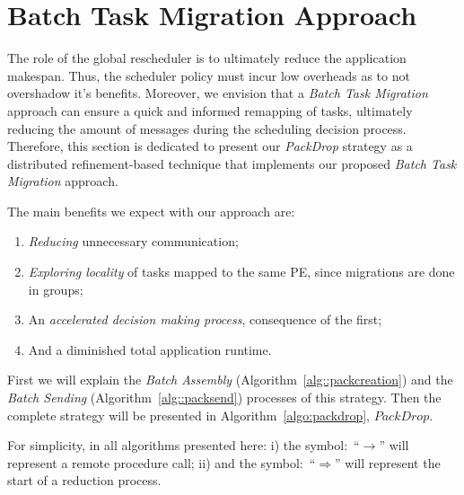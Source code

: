 \section{Batch Task Migration Approach} \label{sec:algo}


The role of the global rescheduler is to ultimately reduce the application makespan. 
Thus, the scheduler policy must incur low overheads as to not overshadow it's benefits. 
Moreover, we envision that a \textit{Batch Task Migration} approach can ensure a quick and informed remapping of tasks, ultimately reducing the amount of messages during the scheduling decision process. 
Therefore, this section is dedicated to present our \textit{PackDrop} strategy as a distributed refinement-based technique that implements our proposed \textit{Batch Task Migration} approach.

The main benefits we expect with our approach are: 
\begin{enumerate}
	\item \textit{Reducing} unnecessary communication;
	\item \textit{Exploring locality} of tasks mapped to the same PE, since migrations are done in groups;
	\item An \textit{accelerated decision making process}, consequence of the first;
	\item And a diminished total application runtime.
\end{enumerate}

First we will explain the \textit{Batch Assembly} (Algorithm~\ref{alg::packcreation}) and the \textit{Batch Sending} (Algorithm~\ref{alg::packsend}) processes of this strategy.
Then the complete strategy will be presented in Algorithm~\ref{algo:packdrop}, $PackDrop$.

For simplicity, in all algorithms presented here: i) the symbol:~``$\rightarrow$'' will represent a remote procedure call; ii) and the symbol:~``$\Rightarrow$'' will  represent the start of a reduction process.


